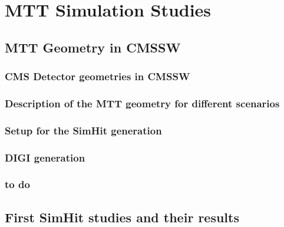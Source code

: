 \section{MTT Simulation Studies}
\subsection{MTT Geometry in CMSSW}
\subsubsection{CMS Detector geometries in CMSSW}
\subsubsection{Description of the MTT geometry for different scenarios}
\subsubsection{Setup for the SimHit generation}
\subsubsection{DIGI generation}
\subsubsection{to do}
\subsection{First SimHit studies and their results}